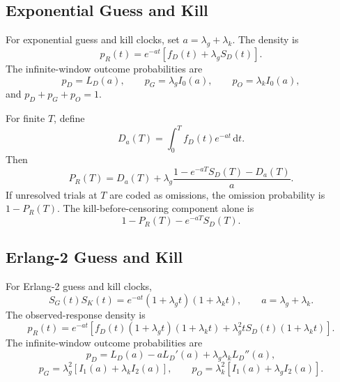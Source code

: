 \documentclass[12pt]{article}
\newcommand{\dd}{\,\mathrm{d}}
\begin{document}
\subsection{Exponential Guess and Kill}
For exponential guess and kill clocks, set $a=\lambda_g+\lambda_k$. The density is
\begin{equation}
  p_R(t)=e^{-at}\left[f_D(t)+\lambda_gS_D(t)\right].
\end{equation}
The infinite-window outcome probabilities are
\begin{equation}
  p_D=L_D(a),
  \qquad
  p_G=\lambda_g I_0(a),
  \qquad
  p_O=\lambda_k I_0(a),
\end{equation}
and $p_D+p_G+p_O=1$.

For finite $T$, define
\begin{equation}
  D_a(T)=\int_0^T f_D(t)e^{-at}\dd t.
\end{equation}
Then
\begin{equation}
  P_R(T)=D_a(T)+
  \lambda_g\frac{1-e^{-aT}S_D(T)-D_a(T)}{a}.
  \label{eq:combined-exp-window}
\end{equation}
If unresolved trials at $T$ are coded as omissions, the omission probability is $1-P_R(T)$. The kill-before-censoring component alone is
\[
  1-P_R(T)-e^{-aT}S_D(T).
\]

\subsection{Erlang-2 Guess and Kill}
For Erlang-2 guess and kill clocks,
\begin{equation}
  S_G(t)S_K(t)=e^{-at}(1+\lambda_gt)(1+\lambda_kt),
  \qquad a=\lambda_g+\lambda_k.
\end{equation}
The observed-response density is
\begin{equation}
  p_R(t)=e^{-at}\left[
  f_D(t)(1+\lambda_gt)(1+\lambda_kt)
  +\lambda_g^2tS_D(t)(1+\lambda_kt)
  \right].
\end{equation}
The infinite-window outcome probabilities are
\begin{equation}
  p_D=L_D(a)-aL_D'(a)+\lambda_g\lambda_kL_D''(a),
  \label{eq:erlang2-decision-prob}
\end{equation}
\begin{equation}
  p_G=\lambda_g^2\left[I_1(a)+\lambda_kI_2(a)\right],
  \qquad
  p_O=\lambda_k^2\left[I_1(a)+\lambda_gI_2(a)\right].
\end{equation}
\end{document}
